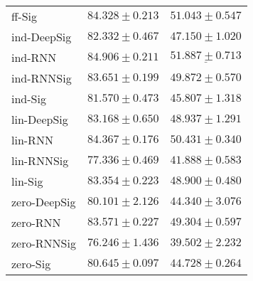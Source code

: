 \begin{tabular}{lll}
ff-Sig         &                           $ 84.328 \pm 0.213 $ &                           $ 51.043 \pm 0.547 $ \\
ind-DeepSig    &                           $ 82.332 \pm 0.467 $ &                           $ 47.150 \pm 1.020 $ \\
ind-RNN        &               $  \mathbf{ 84.906 \pm 0.211 } $ &            $  \underline{ 51.887 \pm 0.713 } $ \\
ind-RNNSig     &                           $ 83.651 \pm 0.199 $ &                           $ 49.872 \pm 0.570 $ \\
ind-Sig        &                           $ 81.570 \pm 0.473 $ &                           $ 45.807 \pm 1.318 $ \\
lin-DeepSig    &                           $ 83.168 \pm 0.650 $ &                           $ 48.937 \pm 1.291 $ \\
lin-RNN        &                           $ 84.367 \pm 0.176 $ &                           $ 50.431 \pm 0.340 $ \\
lin-RNNSig     &                           $ 77.336 \pm 0.469 $ &                           $ 41.888 \pm 0.583 $ \\
lin-Sig        &                           $ 83.354 \pm 0.223 $ &                           $ 48.900 \pm 0.480 $ \\
zero-DeepSig   &                           $ 80.101 \pm 2.126 $ &                           $ 44.340 \pm 3.076 $ \\
zero-RNN       &                           $ 83.571 \pm 0.227 $ &                           $ 49.304 \pm 0.597 $ \\
zero-RNNSig    &                           $ 76.246 \pm 1.436 $ &                           $ 39.502 \pm 2.232 $ \\
zero-Sig       &                           $ 80.645 \pm 0.097 $ &                           $ 44.728 \pm 0.264 $ \\
\bottomrule
\end{tabular}
